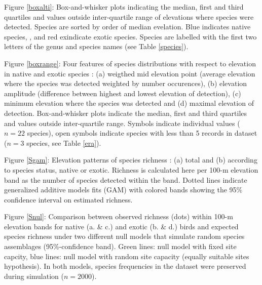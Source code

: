 \documentclass{article}\usepackage[]{graphicx}\usepackage[]{color}
\begin{document}
Figure \ref{boxalti}: Box-and-whisker plots indicating the median, first and third quartiles and values outside inter-quartile range of elevations where species were detected. Species are sorted by order of median evelation. Blue indicates native species, , and red exindicate exotic species. Species are labelled with the first two letters of the genus and species names (see Table \ref{species}).

Figure \ref{boxrange}: Four features of species distributions with respect to elevation in native and exotic species : (a) weigthed mid elevation point (average elevation where the species was detected weighted by number occurences), (b) elevation amplitude (difference between highest and lowest elevation of detection), (c) minimum elevation where the species was detected and (d) maximal elevation of detection. Box-and-whisker plots indicate the median, first and third quartiles and values outside inter-quartile range. Symbols indicate individual values ($n=22$ species), open symbols indicate species with less than 5 records in dataset ($n=3$ species, see Table \ref{era}).

Figure \ref{Sgam}: Elevation patterns of species richness : (a) total and (b) according to species status, native or exotic. Richness is calculated here per 100-m elevation band as the number of species detected within the band. Dotted lines indicate generalized additive models fits (GAM) with colored bands showing the 95\% confidence interval on estimated richness. 

Figure \ref{Snul}: Comparison between observed richness (dots) within 100-m elevation bands for native (a. \& c.) and exotic (b. \& d.) birds and expected species richness under two different null models that simulate random species assemblages (95\%-confidence band). Green lines:  null model with fixed site capcity, blue lines: null model with random site capacity (equally suitable sites hypothesis). In both models, species frequencies in the dataset were preserved during simulation ($n=2000$).

\end{document}
